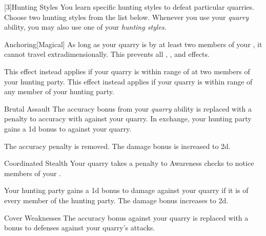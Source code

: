         [3]{Hunting Styles}
        You learn specific hunting styles to defeat particular quarries.
        Choose two hunting styles from the list below.
        Whenever you use your \textit{quarry} ability, you may also use one of your \textit{hunting styles}.
        {
            \begin{ability}{Anchoring}[Magical]
                As long as your quarry is  by at least two members of your , it cannot travel extradimensionally.
                This prevents all , , and  effects.

                \rankline
                 This effect instead applies if your quarry is within \rngmed range of at two members of your hunting party.
                 This effect instead applies if your quarry is within \rnglong range of any member of your hunting party.
            \end{ability}

            \begin{ability}{Brutal Assault}
                The accuracy bonus from your \textit{quarry} ability is replaced with a  penalty to accuracy with  against your quarry.
                In exchange, your hunting party gains a \plus1d bonus to  against your quarry.

                \rankline
                 The accuracy penalty is removed.
                 The damage bonus is increased to \plus2d.
            \end{ability}

            \begin{ability}{Coordinated Stealth}
                Your quarry takes a  penalty to Awareness checks to notice members of your .

                \rankline
                 Your hunting party gains a \plus1d bonus to damage against your quarry if it is \unaware of every member of the hunting party.
                 The damage bonus increases to \plus2d.
            \end{ability}

            \begin{ability}{Cover Weaknesses}
                The accuracy bonus against your quarry is replaced with a  bonus to defenses against your quarry's attacks.


\end{ability}}
